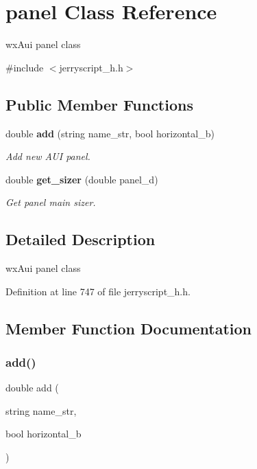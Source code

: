 \section{panel Class Reference}
\label{classpanel}


wx\+Aui panel class  




{\ttfamily \#include $<$jerryscript\+\_\+h.\+h$>$}

\subsection*{Public Member Functions}
\begin{DoxyCompactItemize}
\item 
double \textbf{ add} (string name\+\_\+str, bool horizontal\+\_\+b)
\begin{DoxyCompactList}\small\item\em Add new A\+UI panel. \end{DoxyCompactList}\item 
double \textbf{ get\+\_\+sizer} (double panel\+\_\+d)
\begin{DoxyCompactList}\small\item\em Get panel main sizer. \end{DoxyCompactList}\end{DoxyCompactItemize}


\subsection{Detailed Description}
wx\+Aui panel class 

Definition at line 747 of file jerryscript\+\_\+h.\+h.



\subsection{Member Function Documentation}
\mbox{\label{classpanel_a79fc398bf48fc29226a5d64371047def}} 
\subsubsection{add()}
{\footnotesize\ttfamily double add (\begin{DoxyParamCaption}\item[{string}]{name\+\_\+str,  }\item[{bool}]{horizontal\+\_\+b }\end{DoxyParamCaption})}



